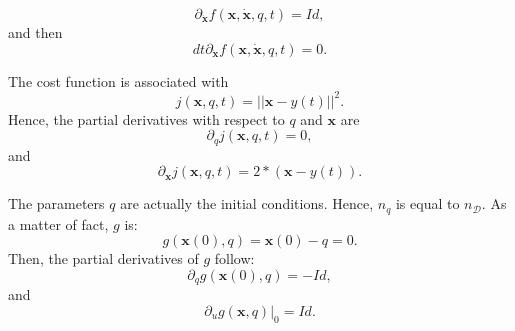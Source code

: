 \documentclass[aip,pof,nofootinbib,reprint,onecolumn]{revtex4-1}
\newcommand{\gras}[1]{\boldsymbol{#1}}
\newcommand{\mypar}[1]{\left(#1\right)}
\newcommand{\Nphaz}{n_{\mathcal{D}}} %
\newcommand{\fdyn}{f} %
\newcommand{\costff}{j} %
\newcommand{\obs}{y} %
\newcommand{\point}{\gras{x}} %
\begin{document}
$$\partial_{\dot{\point}} \fdyn\mypar{\point,\dot{\point},q,t}  = Id,$$
and then $$dt\partial_{\dot{\point}} \fdyn\mypar{\point,\dot{\point},q,t}  = 0. $$

The cost function is associated with
$$\costff\mypar{\point,q,t} = || \point-\obs(t)||^2.$$
Hence, the partial derivatives with respect to $q$ and $\point$ are
$$\partial_q \costff\mypar{\point,q,t} = 0,$$
and
$$\partial_{\point} \costff\mypar{\point,q,t} = 2*\mypar{\point-\obs(t)}.$$

The parameters $q$ are actually the initial conditions. Hence, $n_q$ is equal to $\Nphaz$. As a matter of fact, $g$ is:
$$g(\point(0),q) = \point(0)-q = 0.$$
Then, the partial derivatives of $g$ follow:
$$\partial_q g(\point(0),q) = -Id,$$
and
$$\partial_u g(\point,q)|_0 = Id.$$
\end{document}
